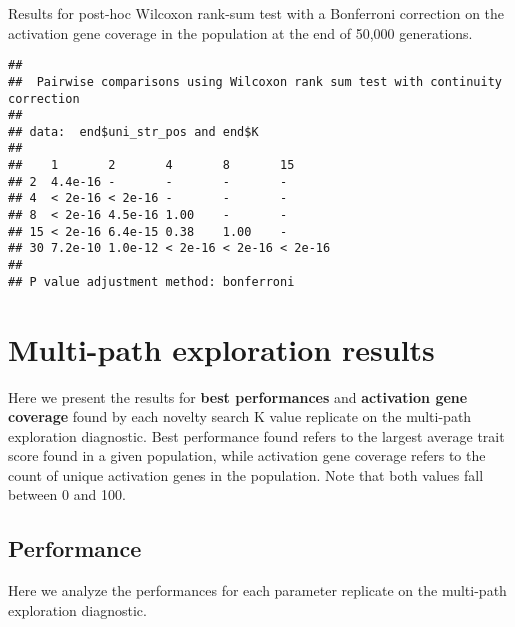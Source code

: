 \documentclass[]{book}
\newenvironment{Shaded}{\begin{snugshade}}{\end{snugshade}}
\newcommand{\DataTypeTok}[1]{\textcolor[rgb]{0.13,0.29,0.53}{#1}}
\newcommand{\KeywordTok}[1]{\textcolor[rgb]{0.13,0.29,0.53}{\textbf{#1}}}
\newcommand{\NormalTok}[1]{#1}
\newcommand{\OperatorTok}[1]{\textcolor[rgb]{0.81,0.36,0.00}{\textbf{#1}}}
\newcommand{\OtherTok}[1]{\textcolor[rgb]{0.56,0.35,0.01}{#1}}
\newcommand{\StringTok}[1]{\textcolor[rgb]{0.31,0.60,0.02}{#1}}
\begin{document}
Results for post-hoc Wilcoxon rank-sum test with a Bonferroni correction on the activation gene coverage in the population at the end of 50,000 generations.

\begin{Shaded}
\end{Shaded}

\begin{verbatim}
## 
##  Pairwise comparisons using Wilcoxon rank sum test with continuity correction 
## 
## data:  end$uni_str_pos and end$K 
## 
##    1       2       4       8       15     
## 2  4.4e-16 -       -       -       -      
## 4  < 2e-16 < 2e-16 -       -       -      
## 8  < 2e-16 4.5e-16 1.00    -       -      
## 15 < 2e-16 6.4e-15 0.38    1.00    -      
## 30 7.2e-10 1.0e-12 < 2e-16 < 2e-16 < 2e-16
## 
## P value adjustment method: bonferroni
\end{verbatim}

\hypertarget{multi-path-exploration-results-6}{%
\section{Multi-path exploration results}\label{multi-path-exploration-results-6}}

Here we present the results for \textbf{best performances} and \textbf{activation gene coverage} found by each novelty search K value replicate on the multi-path exploration diagnostic.
Best performance found refers to the largest average trait score found in a given population, while activation gene coverage refers to the count of unique activation genes in the population.
Note that both values fall between 0 and 100.

\hypertarget{performance-12}{%
\subsection{Performance}\label{performance-12}}

Here we analyze the performances for each parameter replicate on the multi-path exploration diagnostic.
\end{document}
